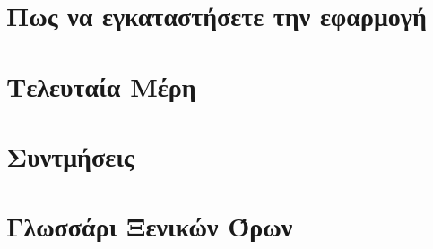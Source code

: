 \documentclass[a4paper,11pt,oneside,openany]{ioniothesis}
\begin{document}
\chapter{Πως να εγκαταστήσετε την εφαρμογή} \label{chapter:installation}



%


\chapter{Τελευταία Μέρη} \label{chapter:telos}







\begin{thebibliography}{99} 
\pagestyle{headings}

\end{thebibliography}


\chapter*{Συντμήσεις} \pagestyle{empty}



\chapter*{Γλωσσάρι Ξενικών Όρων} \pagestyle{empty}






\newpage
{}
\printindex
\end{document}
